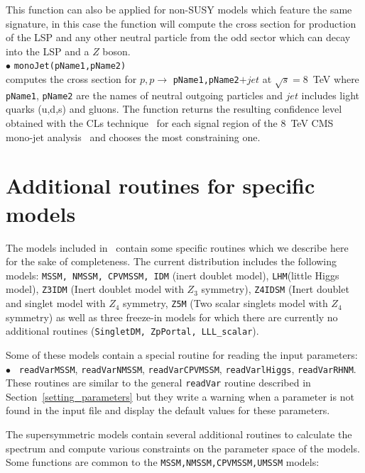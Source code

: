 \documentclass[12pt,a4paper]{article}
\begin{document}
This function can also be applied for non-SUSY models which feature the same signature, in this case the function will compute the cross section for production of the LSP and any other neutral particle from the odd sector which can decay into the LSP and a $Z$ boson.\\[2mm]
%
\noi$\bullet$   \verb|monoJet(pName1,pName2)|\\
computes the cross section for $p,p\rightarrow$ \verb|pName1,pName2|$ +jet$ at $\sqrt{s}=8$~TeV 
where \verb|pName1|, \verb|pName2| are the names of neutral outgoing particles and $jet$ includes light quarks (u,d,s)  and gluons.
The function returns  the resulting  confidence level  obtained with the CLs technique~\cite{Read:2002hq,Read:2000ru} for each  signal region of the 8~TeV CMS mono-jet analysis~\cite{Khachatryan:2014rra} and chooses the most constraining one.



\section{Additional routines for specific models}
The models included in \micro\ contain some specific routines
which we describe here for the sake of completeness. The current 
distribution includes the following models: {\tt MSSM, NMSSM, CPVMSSM, IDM}  (inert doublet model), {\tt LHM}(little Higgs model),
  {\tt Z3IDM} (Inert doublet model with $Z_3$ symmetry), {\tt Z4IDSM} (Inert doublet and singlet model with $Z_4$ symmetry,  {\tt Z5M} (Two scalar  singlets model with $Z_4$ symmetry) as well as three freeze-in models for which there are currently no additional routines (\verb|SingletDM, ZpPortal, LLL_scalar|).

Some of these models contain a special routine for reading the input parameters:\\
$\bullet$ \verb| readVarMSSM|, \verb|readVarNMSSM|,  \verb|readVarCPVMSSM|,
\verb|readVarlHiggs|, \verb|readVarRHNM|.\\
 These routines  are similar to the general 
\verb|readVar| routine described  in Section~\ref{setting_parameters}
but  they write a warning when a parameter is not found in the 
input file and display the default values for these parameters.

The supersymmetric models contain several additional routines to calculate the spectrum
and compute various constraints on the parameter space of the models. Some functions are
common to the \verb|MSSM,NMSSM,CPVMSSM,UMSSM| models: 
\end{document}
